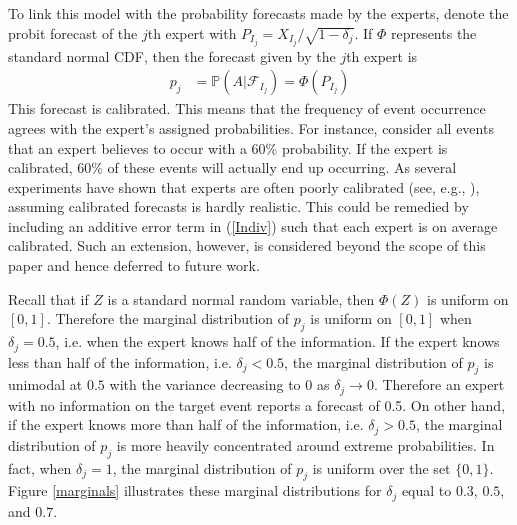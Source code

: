 \documentclass[11pt,twoside]{article}
\renewcommand{\P}{\mathbb{P}}
\theoremstyle{definition}
\theoremstyle{definition}
\begin{document}
To link this model with the probability forecasts made by the experts, denote the probit forecast of the $j$th expert with $P_{I_j} = X_{I_j}/\sqrt{1-\delta_j}$.  If $\Phi$ represents the standard normal CDF, then the forecast given by the $j$th expert is
\begin{align}
p_j &= \P\left(A | \mathcal{F}_{I_j}\right) = \Phi\left( P_{I_j}\right) \label{Indiv}
\end{align}
This forecast is calibrated. This means that the frequency of event occurrence agrees with the expert's assigned probabilities. For instance, consider all events that an expert believes to occur with a 60\% probability. If the expert is calibrated, 60\% of these events will actually end up occurring. As several experiments have shown that experts are often poorly calibrated (see, e.g., \citet{cooke1991experts, shlyakhter1994quantifying}), assuming calibrated forecasts is hardly realistic. This could be remedied by including an additive error term in (\ref{Indiv}) such that each expert is on average calibrated. Such an extension, however, is considered beyond the scope of this paper and hence deferred to future work. 

Recall that if $Z$ is a standard normal random variable, then $\Phi(Z)$ is uniform on $[0,1]$. Therefore the marginal distribution of $p_j$ is uniform on $[0,1]$ when $\delta_j = 0.5$, i.e. when the expert knows half of the information. If the expert knows less than half of the information, i.e. $\delta_j < 0.5$, the marginal distribution of $p_j$ is unimodal at $0.5$ with the variance decreasing to 0 as $\delta_j \to 0$. Therefore an expert with no information on the target event reports a forecast of 0.5. On other hand, if the expert knows more than half of the information, i.e. $\delta_j > 0.5$, the marginal  distribution of $p_j$ is more heavily concentrated around extreme probabilities. In fact, when $\delta_j = 1$, the marginal distribution of $p_j$ is uniform over the set $\{0,1\}$. Figure \ref{marginals} illustrates these marginal distributions for $\delta_j$ equal to $0.3$, $0.5$, and $0.7$. 
\end{document}
